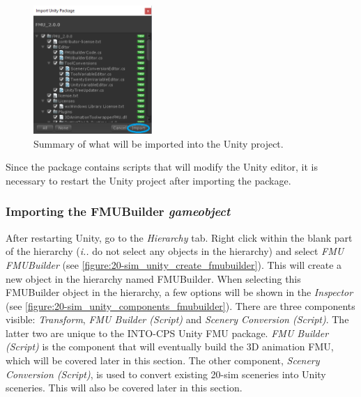 \begin{figure}[ht]
	\centerline{\includegraphics[width=0.4\textwidth]{figures/20sim_Unity2.png}}
	\caption{Summary of what will be imported into the Unity project.}
	\label{figure:20-sim_import_unity_package_dialog}
\end{figure}
%
Since the package contains scripts that will modify the Unity editor, it is necessary to restart the Unity project after importing the package. 
%
%
%
\subsubsection{Importing the FMUBuilder \textit{gameobject}}
After restarting Unity, go to the \textit{Hierarchy} tab. Right click within the blank part of the hierarchy (\emph{i.\@e.\@} do not select any objects in the hierarchy) and select \textit{FMU \textrightarrow FMUBuilder} (see \autoref{figure:20-sim_unity_create_fmubuilder}). This will create a new object in the hierarchy named FMUBuilder. When selecting this FMUBuilder object in the hierarchy, a few options will be shown in the \textit{Inspector} (see \autoref{figure:20-sim_unity_components_fmubuilder}). There are three components visible: \textit{Transform}, \textit{FMU Builder (Script)} and \textit{Scenery Conversion (Script)}. The latter two are unique to the INTO-CPS Unity FMU package. \textit{FMU Builder (Script)} is the component that will eventually build the 3D animation FMU, which will be covered later in this section. The other component, \textit{Scenery Conversion (Script)}, is used to convert existing 20-sim sceneries into Unity sceneries. This will also be covered later in this section.

